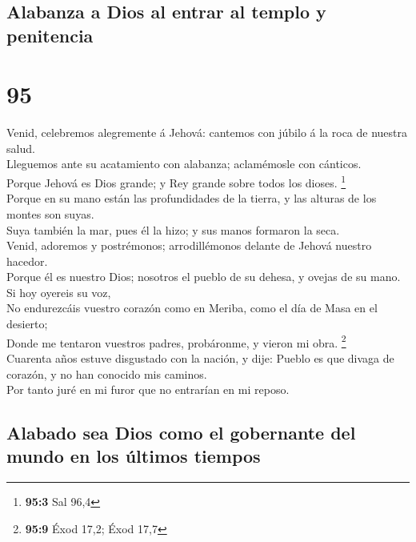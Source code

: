 \hypertarget{alabanza-a-dios-al-entrar-al-templo-y-penitencia}{%
\subsection{Alabanza a Dios al entrar al templo y
penitencia}\label{alabanza-a-dios-al-entrar-al-templo-y-penitencia}}

\hypertarget{section-94}{%
\section{95}\label{section-94}}

 Venid, celebremos alegremente á Jehová: cantemos con júbilo
á la roca de nuestra salud.\\
 Lleguemos ante su acatamiento con alabanza; aclamémosle con
cánticos.\\
 Porque Jehová es Dios grande; y Rey grande sobre todos los
dioses. \footnote{\textbf{95:3} Sal 96,4}\\
 Porque en su mano están las profundidades de la tierra, y
las alturas de los montes son suyas.\\
 Suya también la mar, pues él la hizo; y sus manos formaron
la seca.\\
 Venid, adoremos y postrémonos; arrodillémonos delante de
Jehová nuestro hacedor.\\
 Porque él es nuestro Dios; nosotros el pueblo de su dehesa,
y ovejas de su mano. Si hoy oyereis su voz,\\
 No endurezcáis vuestro corazón como en Meriba, como el día
de Masa en el desierto;\\
 Donde me tentaron vuestros padres, probáronme, y vieron mi
obra. \footnote{\textbf{95:9} Éxod 17,2; Éxod 17,7}\\
 Cuarenta años estuve disgustado con la nación, y dije:
Pueblo es que divaga de corazón, y no han conocido mis caminos.\\
 Por tanto juré en mi furor que no entrarían en mi reposo.

\hypertarget{alabado-sea-dios-como-el-gobernante-del-mundo-en-los-uxfaltimos-tiempos}{%
\subsection{Alabado sea Dios como el gobernante del mundo en los últimos
tiempos}\label{alabado-sea-dios-como-el-gobernante-del-mundo-en-los-uxfaltimos-tiempos}}

